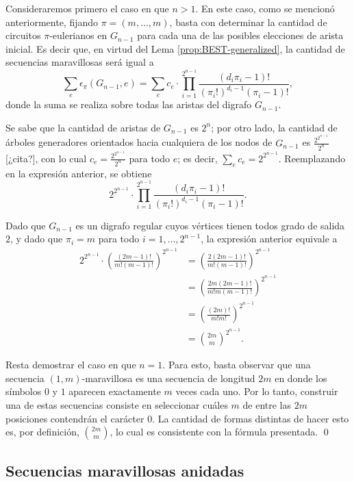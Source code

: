 \documentclass[11pt]{article}
\begin{document}
\begin{demo}
	Consideraremos primero el caso en que $n > 1$.
	En este caso, como se mencionó anteriormente, fijando $\pi = (m, \dots, m)$,
	basta con determinar la cantidad de circuitos $\pi$-eulerianos en $G_{n-1}$
	para cada una de las posibles elecciones de arista inicial.
	Es decir que, en virtud del Lema \ref{prop:BEST-generalized}, la cantidad de
	secuencias maravillosas será igual a \[ \sum_e \epsilon_\pi(G_{n-1}, e) =
		\sum_e c_e \cdot \prod_{i=1}^{2^{n-1}} \frac{(d_i\pi_i - 1)!
		}{(\pi_i!)^{d_i-1}(\pi_i-1)!}, \] donde la suma se realiza sobre todas las
	aristas del digrafo $G_{n-1}$.

	Se sabe que la cantidad de aristas de $G_{n-1}$ es $2^n$; por otro lado, la
	cantidad de árboles generadores orientados hacia cualquiera de los nodos de
	$G_{n-1}$ es $\frac{2^{2^{n-1}}}{2^n}$ [¿cita?], con lo cual $c_e =
		\frac{2^{2^{n-1}}}{2^n}$ para todo $e$; es decir, $\sum_{e} c_e = 2^{2^{n-1}}$.
	Reemplazando en la expresión anterior, se obtiene \[ 2^{2^{n-1}} \cdot
		\prod_{i=1}^{2^{n-1}} \frac{(d_i\pi_i - 1)! }{(\pi_i!)^{d_i-1}(\pi_i-1)!}.
	\]

	Dado que $G_{n-1}$ es un digrafo regular cuyos vértices tienen todos grado de
	salida $2$, y dado que $\pi_i = m$ para todo $i = 1, \dots, 2^{n-1}$, la
	expresión anterior equivale a
	\begin{align*}
		2^{2^{n-1}} \cdot \left( \frac{(2m - 1)! }{m!(m-1)!} \right)^{2^{n-1}}
			&= \left( \frac{2 (2m - 1)! }{m!(m-1)!} \right)^{2^{n-1}} \\
			&= \left( \frac{2m (2m - 1)! }{m!m(m-1)!} \right)^{2^{n-1}} \\
			&= \left( \frac{(2m)! }{m!m!} \right)^{2^{n-1}} \\
			&= \binom{2m}{m}^{2^{n-1}}.
	\end{align*}

	Resta demostrar el caso en que $n = 1$. Para esto, basta observar que una
	secuencia $(1,m)$-maravillosa es una secuencia de longitud $2m$ en donde
	los símbolos $0$ y $1$ aparecen exactamente $m$ veces cada uno. Por lo tanto,
	construir una de estas secuencias consiste en seleccionar cuáles $m$ de entre
	las $2m$ posiciones contendrán el carácter $0$. La cantidad de formas distintas
	de hacer esto es, por definición, $\binom{2m}{m}$, lo cual es consistente con
	la fórmula presentada. \qed
\end{demo}

\subsection{Secuencias maravillosas anidadas}
\end{document}

